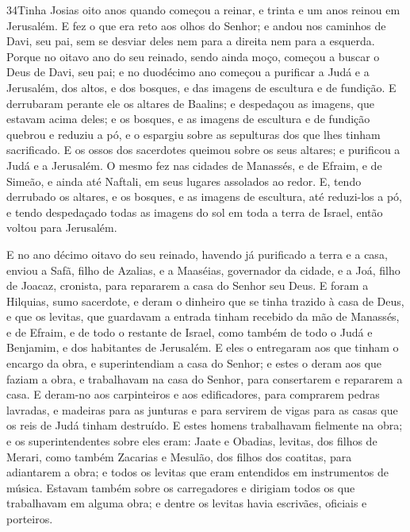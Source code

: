 \lettrine{34} Tinha Josias oito anos quando começou a reinar,
e trinta e um anos reinou em Jerusalém. E fez o que era reto aos
olhos do Senhor; e andou nos caminhos de Davi, seu pai, sem se
desviar deles nem para a direita nem para a esquerda. Porque no
oitavo ano do seu reinado, sendo ainda moço, começou a buscar o Deus
de Davi, seu pai; e no duodécimo ano começou a purificar a Judá e a
Jerusalém, dos altos, e dos bosques, e das imagens de escultura e de
fundição. E derrubaram perante ele os altares de Baalins; e
despedaçou as imagens, que estavam acima deles; e os bosques, e as
imagens de escultura e de fundição quebrou e reduziu a pó, e o
espargiu sobre as sepulturas dos que lhes tinham sacrificado. E
os ossos dos sacerdotes queimou sobre os seus altares; e purificou a
Judá e a Jerusalém. O mesmo fez nas cidades de Manassés, e de
Efraim, e de Simeão, e ainda até Naftali, em seus lugares assolados
ao redor. E, tendo derrubado os altares, e os bosques, e as
imagens de escultura, até reduzi-los a pó, e tendo despedaçado todas
as imagens do sol em toda a terra de Israel, então voltou para
Jerusalém.

E no ano décimo oitavo do seu reinado, havendo já purificado a
terra e a casa, enviou a Safã, filho de Azalias, e a Maaséias,
governador da cidade, e a Joá, filho de Joacaz, cronista, para
repararem a casa do Senhor seu Deus. E foram a Hilquias, sumo
sacerdote, e deram o dinheiro que se tinha trazido à casa de Deus, e
que os levitas, que guardavam a entrada tinham recebido da mão de
Manassés, e de Efraim, e de todo o restante de Israel, como também
de todo o Judá e Benjamim, e dos habitantes de Jerusalém. E
eles o entregaram aos que tinham o encargo da obra, e superintendiam
a casa do Senhor; e estes o deram aos que faziam a obra, e
trabalhavam na casa do Senhor, para consertarem e repararem a casa.
E deram-no aos carpinteiros e aos edificadores, para
comprarem pedras lavradas, e madeiras para as junturas e para
servirem de vigas para as casas que os reis de Judá tinham
destruído. E estes homens trabalhavam fielmente na obra; e os
superintendentes sobre eles eram: Jaate e Obadias, levitas, dos
filhos de Merari, como também Zacarias e Mesulão, dos filhos dos
coatitas, para adiantarem a obra; e todos os levitas que eram
entendidos em instrumentos de música. Estavam também sobre os
carregadores e dirigiam todos os que trabalhavam em alguma obra; e
dentre os levitas havia escrivães, oficiais e porteiros.

